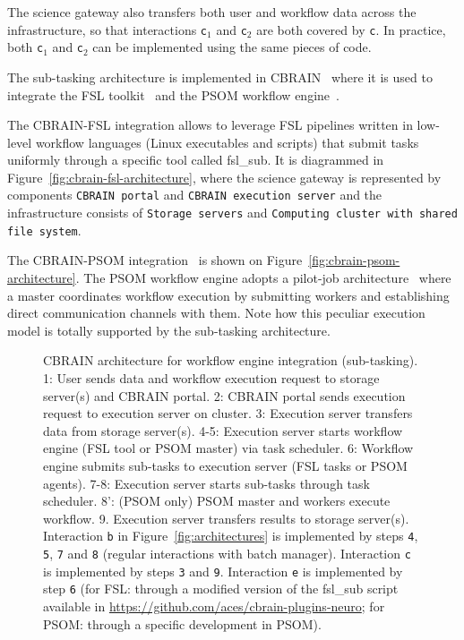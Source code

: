 \documentclass[preprint,3p,twocolumn]{elsarticle}
\begin{document}
The science gateway also transfers both user and workflow data across
the infrastructure, so that interactions \texttt{c$_1$} and
\texttt{c$_2$} are both covered by \texttt{c}. In practice, both
\texttt{c$_1$} and \texttt{c$_2$} can be implemented using the same
pieces of code.

The sub-tasking architecture is implemented in CBRAIN~\cite{SHER-14}
where it is used to integrate the FSL toolkit~\cite{Jenkinson2012782}
and the PSOM workflow engine~\cite{bellec2012pipeline}.

The CBRAIN-FSL integration allows to leverage FSL pipelines written in
low-level workflow languages (Linux executables and scripts) that
submit tasks uniformly through a specific tool called fsl\_sub. It is
diagrammed in Figure~\ref{fig:cbrain-fsl-architecture}, where the
science gateway is represented by components \texttt{CBRAIN portal}
and \texttt{CBRAIN execution server} and the infrastructure consists
of \texttt{Storage servers} and \texttt{Computing cluster with shared
  file system}.

The CBRAIN-PSOM integration~\cite{GLAT-16} is shown on
Figure~\ref{fig:cbrain-psom-architecture}. The PSOM workflow engine
adopts a pilot-job architecture~\cite{turilli2015comprehensive} where
a master coordinates workflow execution by submitting workers and
establishing direct communication channels with them. Note how this
peculiar execution model is totally supported by the sub-tasking
architecture.

\begin{figure}
\centering
{} \hfill {}
\caption{CBRAIN architecture for workflow engine integration
  (sub-tasking).  1: User sends data and workflow execution request to
  storage server(s) and CBRAIN portal. 2: CBRAIN portal sends
  execution request to execution server on cluster. 3: Execution
  server transfers data from storage server(s). 4-5: Execution server
  starts workflow engine (FSL tool or PSOM master) via task
  scheduler. 6: Workflow engine submits sub-tasks to execution server
  (FSL tasks or PSOM agents). 7-8: Execution server starts sub-tasks
  through task scheduler. 8': (PSOM only) PSOM master and workers
  execute workflow. 9. Execution server transfers results to storage
  server(s). Interaction \texttt{b} in Figure~\ref{fig:architectures}
  is implemented by steps \texttt{4}, \texttt{5}, \texttt{7} and
  \texttt{8} (regular interactions with batch manager). Interaction
  \texttt{c} is implemented by steps \texttt{3} and
  \texttt{9}. Interaction \texttt{e} is implemented by step \texttt{6}
  (for FSL: through a modified version of the fsl\_sub script
  available in \url{https://github.com/aces/cbrain-plugins-neuro}; for
  PSOM: through a specific development in PSOM).}
\label{fig:cbrain-sub-tasking}
\end{figure}
\end{document}
